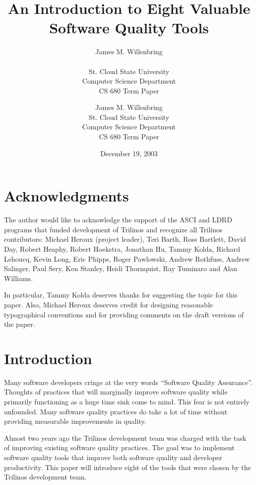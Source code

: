 \documentclass[12pt,relax]{article}
\title{An Introduction to Eight Valuable Software Quality Tools}
\author{
James M. Willenbring \\
 \\
St. Cloud State University\\
Computer Science Department\\
CS 680 Term Paper
}
\date{December 19, 2003} %
\author{
James M. Willenbring \\
St. Cloud State University\\
Computer Science Department\\
CS 680 Term Paper
}
\begin{document}
\maketitle



\clearpage

\section*{Acknowledgments}

The author would like to acknowledge the support of the ASCI and LDRD 
programs that funded development of Trilinos and recognize all Trilinos 
contributors: Michael Heroux (project leader), Teri Barth, Ross Bartlett, 
David Day, Robert Heaphy, Robert Hoekstra, 
Jonathan Hu, Tammy Kolda, Richard Lehoucq, Kevin Long, Eric Phipps, 
Roger Pawlowski, Andrew Rothfuss, Andrew Salinger, Paul Sery, Ken
Stanley, Heidi Thornquist, Ray Tuminaro and Alan Williams.

In particular, Tammy Kolda deserves thanks for suggesting the topic for
this paper.  Also, Michael Heroux deserves credit for designing 
reasonable typographical conventions and for providing comments on the draft
versions of the paper.

\clearpage
\tableofcontents
\listoftables

\clearpage
%

\section{Introduction}
\label{Section:Introduction}

Many software developers cringe at the very words ``Software Quality 
Assurance''.  Thoughts of practices that will marginally improve software 
quality while primarily functioning as a huge time sink come to mind.  This 
fear is not entirely unfounded.  Many software quality practices do take a lot 
of time without providing measurable improvements in quality.

Almost two years ago the Trilinos development team was charged with the task 
of improving existing software quality practices.  The goal was to implement 
software quality tools that improve both software quality and developer 
productivity.  This paper will introduce eight of the tools that were 
chosen by the Trilinos development team.
\end{document}
